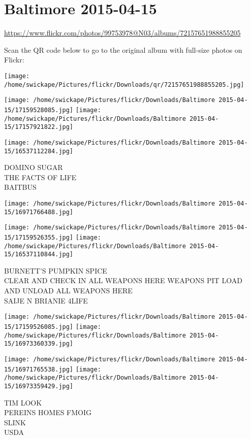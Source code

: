 \documentclass[10pt,letterpaper]{article}
\title{}
\author{}
\date{}
\begin{document}
\section*{Baltimore 2015-04-15}

\url{https://www.flickr.com/photos/99753978@N03/albums/72157651988855205}

Scan the QR code below to go to the original album with full-size photos on Flickr:

\texttt{[image: /home/swickape/Pictures/flickr/Downloads/qr/72157651988855205.jpg]}
\pagebreak

\texttt{[image: /home/swickape/Pictures/flickr/Downloads/Baltimore 2015-04-15/17159528085.jpg]}
\texttt{[image: /home/swickape/Pictures/flickr/Downloads/Baltimore 2015-04-15/17157921822.jpg]}

\texttt{[image: /home/swickape/Pictures/flickr/Downloads/Baltimore 2015-04-15/16537112284.jpg]}

DOMINO SUGAR\\
THE FACTS OF LIFE\\
BAITBUS
\pagebreak

\texttt{[image: /home/swickape/Pictures/flickr/Downloads/Baltimore 2015-04-15/16971766488.jpg]}

\vspace{0.25in}
\texttt{[image: /home/swickape/Pictures/flickr/Downloads/Baltimore 2015-04-15/17159526355.jpg]}
\texttt{[image: /home/swickape/Pictures/flickr/Downloads/Baltimore 2015-04-15/16537110844.jpg]}

BURNETT'S PUMPKIN SPICE\\
CLEAR AND CHECK IN ALL WEAPONS HERE WEAPONS PIT LOAD AND UNLOAD ALL WEAPONS HERE\\
SAIJE N BRIANIE 4LIFE
\pagebreak

\texttt{[image: /home/swickape/Pictures/flickr/Downloads/Baltimore 2015-04-15/17159526085.jpg]}
\texttt{[image: /home/swickape/Pictures/flickr/Downloads/Baltimore 2015-04-15/16973360339.jpg]}

\texttt{[image: /home/swickape/Pictures/flickr/Downloads/Baltimore 2015-04-15/16971765538.jpg]}
\texttt{[image: /home/swickape/Pictures/flickr/Downloads/Baltimore 2015-04-15/16973359429.jpg]}

TIM LOOK\\
PEREINS HOMES FMOIG\\
SLINK\\
USDA
\pagebreak
\end{document}
